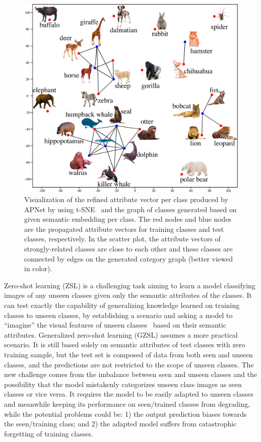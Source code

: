 \documentclass[letterpaper]{article}
\begin{document}
\begin{figure}[ht!]
\begin{center}
\includegraphics[width=\columnwidth]{TSNE-VIS.pdf}
\end{center}
\caption{Visualization of the refined attribute vector per class produced by APNet by using t-SNE~\cite{maaten2008visualizing} and the graph of classes generated based on given semantic embedding per class. The red nodes and blue nodes are the propagated attribute vectors for training classes and test classes, respectively. In the scatter plot, the attribute vectors of strongly-related classes are close to each other and these classes are connected by edges on the generated category graph (better viewed in color).}
\label{fig:TSNE-Results}
\end{figure}


Zero-shot learning (ZSL) is a challenging task aiming to learn a model classifying  images of any unseen classes given only the semantic attributes of the classes. It can test exactly the capability of generalizing knowledge learned on training classes to unseen classes, by establishing a scenario and asking a model to ``imagine'' the visual features of unseen classes~\cite{lampert2013attribute} based on their semantic attributes.
Generalized zero-shot learning (GZSL) assumes a more practical scenario. It is still based solely on semantic attributes of test classes with zero training sample, but the test set is composed of data from both seen and unseen classes, and the predictions are not restricted to the scope of unseen classes. The new challenge comes from the imbalance between seen and unseen classes and the possibility that the model mistakenly categorizes unseen class images as seen classes or vice versa.
It requires the model to be easily adapted to unseen classes and meanwhile keeping its performance on seen/trained classes from degrading, while the potential problems could be: 1) the output prediction biases towards the seen/training class; and 2) the adapted model suffers from catastrophic forgetting of training classes.
\end{document}
